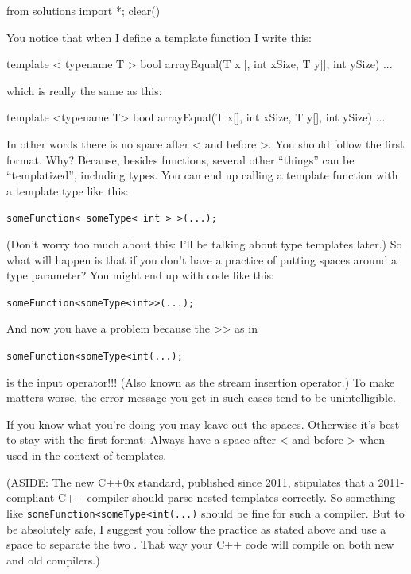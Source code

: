 \begin{python0}
from solutions import *; clear()
\end{python0}

You notice that when I define a template function I write this:

\begin{consolethree}[escapeinside=||]
template < typename T >
bool arrayEqual(T x[], int xSize, T y[], int ySize)
{
    ...
}
\end{consolethree}

which is really the same as this:

\begin{consolethree}[escapeinside=||]
template <typename T>
bool arrayEqual(T x[], int xSize, T y[], int ySize)
{
    ...
}
\end{consolethree}

In other words there is no space after < and before
>. You should follow the first format. Why? Because, besides
functions, several other ``things'' can be ``templatized'', including
types. You can end up calling a template function with a template type
like this:

\verb!someFunction< someType< int > >(...);!

(Don't worry too much about this: I'll be talking about type templates
later.) So what will happen is that if you don't have a
practice of putting spaces around a type parameter? You might end up
with code like this:

\verb!someFunction<someType<int>>(...);!

And now you have a problem because the >> as in

\texttt{someFunction<someType<int\EMPHASIZE{>>}(...);}

is the input operator!!! (Also known as the stream insertion operator.)
To make matters worse, the error message you get in such cases tend to
be unintelligible.

If you know what you're doing you may leave out the
spaces. Otherwise it's best to stay with the first
format: Always have a space after < and before >
when used in the context of templates.

(ASIDE: The new C++0x standard, published since 2011, stipulates that a
2011-compliant C++ compiler should parse nested templates correctly. So
something like \texttt{someFunction<someType<int\EMPHASIZE{>>}(...)} should be fine for such a compiler. But to be absolutely safe, I suggest you follow the practice as stated above and use a space to separate the two \EMPHASIZE{>>}. That way your C++ code will compile on both new and old compilers.)


